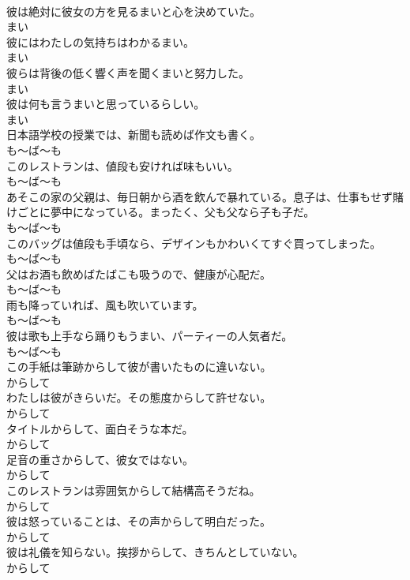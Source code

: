 \documentclass[8pt]{extreport}
\begin{document}
\begin{CJK}{UTF8}{min}
\\	彼は絶対に彼女の方を見るまいと心を決めていた。	
\\	まい
\\	彼にはわたしの気持ちはわかるまい。	
\\	まい
\\	彼らは背後の低く響く声を聞くまいと努力した。	
\\	まい
\\	彼は何も言うまいと思っているらしい。	
\\	まい
\\	日本語学校の授業では、新聞も読めば作文も書く。	
\\	も～ば～も
\\	このレストランは、値段も安ければ味もいい。	
\\	も～ば～も
\\	あそこの家の父親は、毎日朝から酒を飲んで暴れている。息子は、仕事もせず賭けごとに夢中になっている。まったく、父も父なら子も子だ。	
\\	も～ば～も
\\	このバッグは値段も手頃なら、デザインもかわいくてすぐ買ってしまった。	
\\	も～ば～も
\\	父はお酒も飲めばたばこも吸うので、健康が心配だ。	
\\	も～ば～も
\\	雨も降っていれば、風も吹いています。	
\\	も～ば～も
\\	彼は歌も上手なら踊りもうまい、パーティーの人気者だ。	
\\	も～ば～も
\\	この手紙は筆跡からして彼が書いたものに違いない。	
\\	からして
\\	わたしは彼がきらいだ。その態度からして許せない。	
\\	からして
\\	タイトルからして、面白そうな本だ。	
\\	からして
\\	足音の重さからして、彼女ではない。	
\\	からして
\\	このレストランは雰囲気からして結構高そうだね。	
\\	からして
\\	彼は怒っていることは、その声からして明白だった。	
\\	からして
\\	彼は礼儀を知らない。挨拶からして、きちんとしていない。	
\\	からして

\end{CJK}
\end{document}
